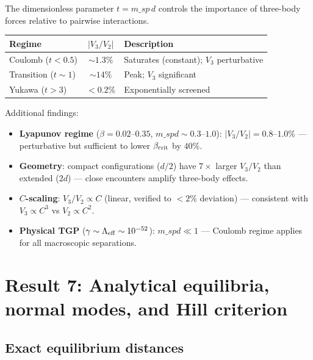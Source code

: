 \documentclass[11pt,a4paper]{article}
\def\msp{m\_sp}%
\newcommand{\msp}{m_{\rm sp}}
\begin{document}
The dimensionless parameter $t = \msp\,d$ controls the importance of
three-body forces relative to pairwise interactions.

\begin{center}
\begin{tabular}{lcl}
  \toprule
  \textbf{Regime} & $|V_3/V_2|$ & \textbf{Description} \\
  \midrule
  Coulomb ($t < 0.5$) & $\sim 1.3\%$ & Saturates (constant); $V_3$ perturbative \\
  Transition ($t \sim 1$) & $\sim 14\%$ & Peak; $V_3$ significant \\
  Yukawa ($t > 3$) & $< 0.2\%$ & Exponentially screened \\
  \bottomrule
\end{tabular}
\end{center}

\noindent Additional findings:
\begin{itemize}[nosep]
  \item \textbf{Lyapunov regime} ($\beta = 0.02$--$0.35$,
        $\msp d \sim 0.3$--$1.0$): $|V_3/V_2| = 0.8$--$1.0\%$ ---
        perturbative but sufficient to lower $\beta_{\rm crit}$ by $40\%$.
  \item \textbf{Geometry}: compact configurations ($d/2$) have $7\times$
        larger $V_3/V_2$ than extended ($2d$) --- close encounters amplify
        three-body effects.
  \item \textbf{$C$-scaling}: $V_3/V_2 \propto C$ (linear, verified to
        $<2\%$ deviation) --- consistent with $V_3 \propto C^3$ vs
        $V_2 \propto C^2$.
  \item \textbf{Physical TGP} ($\gamma \sim \Lambda_{\rm eff} \sim 10^{-52}$):
        $\msp d \ll 1$ --- Coulomb regime applies for all macroscopic
        separations.
\end{itemize}

\section{Result 7: Analytical equilibria, normal modes, and Hill criterion}
\label{sec:analytical}

\subsection{Exact equilibrium distances}
\end{document}
